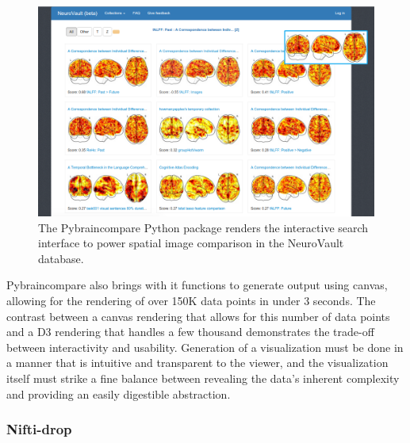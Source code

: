 \documentclass{report}
\begin{document}
\begin{figure}[h!]
\begin{center}
\includegraphics[width=15cm]{images/figure55.png}
\end{center}
 \caption{\label{fig:55} The Pybraincompare Python package renders the interactive search interface to power spatial image comparison in the NeuroVault database.}
\end{figure}

Pybraincompare also brings with it functions to generate output using
canvas, allowing for the rendering of over 150K data points in under 3
seconds. The contrast between a canvas rendering that allows for this number of data points and a D3 rendering that handles a few thousand demonstrates the trade-off between interactivity and usability. Generation of a visualization must be done in a
manner that is intuitive and transparent to the viewer, and the
visualization itself must strike a fine balance between revealing the
data's inherent complexity and providing an easily digestible
abstraction.

\subsubsection{Nifti-drop}
\end{document}
